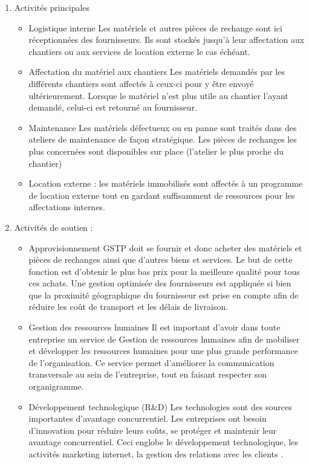 \begin{enumerate}
\item Activités principales
\begin{itemize}
\item Logistique interne
Les matériels et autres pièces de rechange sont ici réceptionnées des fournisseurs. Ils sont stockés jusqu'à leur affectation aux chantiers ou aux services de location externe le cas échéant.

\item Affectation du matériel aux chantiers
Les matériels demandés par les différents chantiers sont affectés à ceux-ci pour y être envoyé ultérieurement. Lorsque le matériel n’est plus utile au chantier l’ayant demandé, celui-ci est retourné au fournisseur.


\item Maintenance
Les matériels défectueux ou en panne sont traités dans des ateliers de maintenance de façon stratégique. Les pièces de rechanges les plus concernées sont disponibles sur place (l’atelier le plus proche du chantier)

\item Location externe :
les matériels immobilisés sont affectés à un programme de location externe tout en gardant suffisamment de ressources pour les affectations internes.

\end{itemize}

\item Activités de soutien :
\begin{itemize}
\item Approvisionnement
GSTP doit se fournir et donc acheter des matériels et pièces de rechanges ainsi que d’autres biens et services. Le but de cette fonction est d'obtenir le plus bas prix pour la meilleure qualité pour tous ces achats. Une gestion optimisée des fournisseurs est appliquée si bien que la proximité géographique du fournisseur est prise en compte afin de réduire les coût de transport et les délais de livraison.
\item Gestion des ressources humaines
Il est important d’avoir dans toute entreprise un service de Gestion de ressources humaines afin de mobiliser et développer les ressources humaines pour une plus grande performance de l'organisation. Ce service permet d’améliorer la communication transversale au sein de l’entreprise, tout en faisant respecter son organigramme.

\item Développement technologique (R&D)
Les technologies sont des sources importantes d'avantage concurrentiel. Les entreprises ont besoin d'innovation pour réduire leurs coûts, se protéger et maintenir leur avantage concurrentiel. Ceci englobe le développement technologique, les activités marketing internet, la gestion des relations avec les clients .

\end{itemize}
\end{enumerate}
